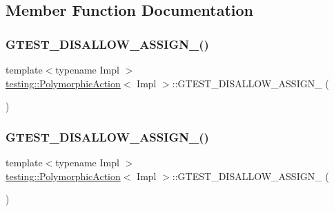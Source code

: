 \subsection{Member Function Documentation}
\mbox{\label{classtesting_1_1_polymorphic_action_a12db33e1d2f389637961994c851c97b6}} 
\subsubsection{\texorpdfstring{GTEST\_DISALLOW\_ASSIGN\_()}{GTEST\_DISALLOW\_ASSIGN\_()}\hspace{0.1cm}{\footnotesize\ttfamily [1/3]}}
{\footnotesize\ttfamily template$<$typename Impl $>$ \\
\mbox{\hyperlink{classtesting_1_1_polymorphic_action}{testing\+::\+Polymorphic\+Action}}$<$ Impl $>$\+::G\+T\+E\+S\+T\+\_\+\+D\+I\+S\+A\+L\+L\+O\+W\+\_\+\+A\+S\+S\+I\+G\+N\+\_\+ (\begin{DoxyParamCaption}\item[{\mbox{\hyperlink{classtesting_1_1_polymorphic_action}{Polymorphic\+Action}}$<$ Impl $>$}]{ }\end{DoxyParamCaption})\hspace{0.3cm}{\ttfamily [private]}}

\mbox{\label{classtesting_1_1_polymorphic_action_a12db33e1d2f389637961994c851c97b6}} 
\subsubsection{\texorpdfstring{GTEST\_DISALLOW\_ASSIGN\_()}{GTEST\_DISALLOW\_ASSIGN\_()}\hspace{0.1cm}{\footnotesize\ttfamily [2/3]}}
{\footnotesize\ttfamily template$<$typename Impl $>$ \\
\mbox{\hyperlink{classtesting_1_1_polymorphic_action}{testing\+::\+Polymorphic\+Action}}$<$ Impl $>$\+::G\+T\+E\+S\+T\+\_\+\+D\+I\+S\+A\+L\+L\+O\+W\+\_\+\+A\+S\+S\+I\+G\+N\+\_\+ (\begin{DoxyParamCaption}\item[{\mbox{\hyperlink{classtesting_1_1_polymorphic_action}{Polymorphic\+Action}}$<$ Impl $>$}]{ }\end{DoxyParamCaption})\hspace{0.3cm}{\ttfamily [private]}}

